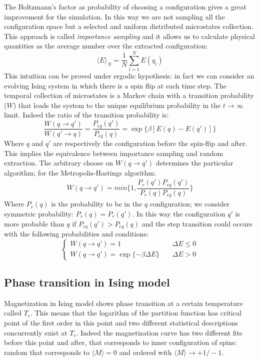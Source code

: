 \documentclass[11pt,a4paper]{article}
\begin{document}
\newpage
The Boltzmann's factor as probability of choosing a configuration gives a great improvement for the simulation. In this way we are not sampling all the configuration space but a selected and uniform distributed microstates collection. This approach is called \textit{importance sampling} and it allows us to calculate physical quantities as the average number over the extracted configuration:
$$
  \langle E \rangle_N = \dfrac{1}{N} \sum_{i=1}^{N}{E(q_i)}
$$
This intuition can be proved under ergodic hypothesis: in fact we can consider an evolving Ising system in which there is a spin flip at each time step. The temporal collection of microstates is a Markov chain with a transition probability ($W$) that leads the system to the unique equilibrium probability in the $t \rightarrow \infty$ limit. Indeed the ratio of the transition probability is:
\begin{equation}
\dfrac{W(q \rightarrow q')}{W(q' \rightarrow q)} = \dfrac{P_{eq}(q')}{P_{eq}(q)}= \exp \lbrace \beta [E(q) - E(q')] \rbrace 
\end{equation}
Where $q$ and $q'$ are respectively the configuration before the spin-flip and after. This implies the equivalence between importance sampling and random extraction. The arbitrary choose on $W(q \rightarrow q')$ determines the particular algorithm; for the Metropolis-Hastings algorithm:
\begin{eqnarray}
W(q \rightarrow q') = min \bigg \lbrace 1 , \dfrac{P_r(q')P_{eq}(q')}{P_r(q)P_{eq}(q)} \bigg \rbrace
\end{eqnarray}
Where $P_r(q)$ is the probability to be in the $q$ configuration; we consider symmetric probability: $P_r(q)=P_r(q')$. In this way the configuration $q'$ is more probable than $q$ if $P_{eq}(q')>P_{eq}(q)$ and the step transition could occurs with the following probabilities and conditions: 
\[
\begin{cases}
  W(q \rightarrow q')=1 &\quad \Delta E \leq 0 \\
  W(q \rightarrow q')=\exp \lbrace -\beta  \Delta E  \rbrace  &\quad \Delta E > 0
\end{cases}
\]
\bigskip

\subsection*{Phase transition in Ising model}
Magnetization in Ising model shows phase transition at a certain temperature called $T_c$. This means that the logarithm of the partition function has critical point of the first order in this point and two different statistical descriptions concurrently exist at $T_c$. Indeed the magnetization curve has two different fits before this point and after, that corresponds to inner configuration of spins: random that corresponds to $\langle M \rangle = 0$ and ordered with $\langle M \rangle \rightarrow +1 / -1$.
\end{document}
